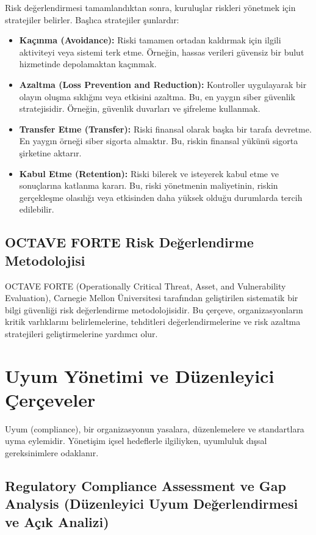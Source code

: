 Risk değerlendirmesi tamamlandıktan sonra, kuruluşlar riskleri yönetmek için stratejiler belirler. Başlıca stratejiler şunlardır:
\begin{itemize}
    \item \textbf{Kaçınma (Avoidance):} Riski tamamen ortadan kaldırmak için ilgili aktiviteyi veya sistemi terk etme. Örneğin, hassas verileri güvensiz bir bulut hizmetinde depolamaktan kaçınmak.
    \item \textbf{Azaltma (Loss Prevention and Reduction):} Kontroller uygulayarak bir olayın oluşma sıklığını veya etkisini azaltma. Bu, en yaygın siber güvenlik stratejisidir. Örneğin, güvenlik duvarları ve şifreleme kullanmak.
    \item \textbf{Transfer Etme (Transfer):} Riski finansal olarak başka bir tarafa devretme. En yaygın örneği siber sigorta almaktır. Bu, riskin finansal yükünü sigorta şirketine aktarır.
    \item \textbf{Kabul Etme (Retention):} Riski bilerek ve isteyerek kabul etme ve sonuçlarına katlanma kararı. Bu, riski yönetmenin maliyetinin, riskin gerçekleşme olasılığı veya etkisinden daha yüksek olduğu durumlarda tercih edilebilir.
\end{itemize}

\subsection{OCTAVE FORTE Risk Değerlendirme Metodolojisi}



OCTAVE FORTE (Operationally Critical Threat, Asset, and Vulnerability Evaluation), Carnegie Mellon Üniversitesi tarafından geliştirilen sistematik bir bilgi güvenliği risk değerlendirme metodolojisidir. Bu çerçeve, organizasyonların kritik varlıklarını belirlemelerine, tehditleri değerlendirmelerine ve risk azaltma stratejileri geliştirmelerine yardımcı olur.

\section{Uyum Yönetimi ve Düzenleyici Çerçeveler}

Uyum (compliance), bir organizasyonun yasalara, düzenlemelere ve standartlara uyma eylemidir. Yönetişim içsel hedeflerle ilgiliyken, uyumluluk dışsal gereksinimlere odaklanır.

\subsection{Regulatory Compliance Assessment ve Gap Analysis (Düzenleyici Uyum Değerlendirmesi ve Açık Analizi)}

